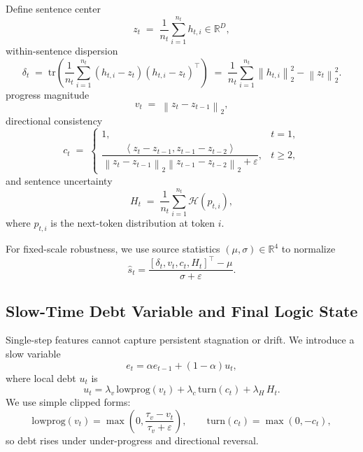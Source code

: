 \documentclass{article}
\newcommand{\R}{\mathbb{R}}
\newcommand{\norm}[1]{\left\lVert #1 \right\rVert}
\newcommand{\inner}[2]{\left\langle #1, #2 \right\rangle}
\newcommand{\tr}{\mathrm{tr}}
\newcommand{\eps}{\varepsilon}
\begin{document}
Define sentence center
\begin{equation}
z_t \;=\; \frac{1}{n_t}\sum_{i=1}^{n_t} h_{t,i} \in \R^D,
\label{eq:zt}
\end{equation}
within-sentence dispersion
\begin{equation}
\delta_t \;=\; \tr\!\left(
\frac{1}{n_t}\sum_{i=1}^{n_t}(h_{t,i}-z_t)(h_{t,i}-z_t)^\top
\right)
\;=\; \frac{1}{n_t}\sum_{i=1}^{n_t} \norm{h_{t,i}}_2^2 - \norm{z_t}_2^2.
\label{eq:disp}
\end{equation}
progress magnitude
\begin{equation}
v_t \;=\; \norm{z_t-z_{t-1}}_2,
\label{eq:speed}
\end{equation}
directional consistency
\begin{equation}
c_t \;=\;
\begin{cases}
1, & t=1,\\[3pt]
\dfrac{\inner{z_t-z_{t-1}}{z_{t-1}-z_{t-2}}}
{\norm{z_t-z_{t-1}}_2\norm{z_{t-1}-z_{t-2}}_2+\eps}, & t\ge 2,
\end{cases}
\label{eq:consistency}
\end{equation}
and sentence uncertainty
\begin{equation}
H_t \;=\; \frac{1}{n_t}\sum_{i=1}^{n_t} \mathcal{H}(p_{t,i}),
\label{eq:entropy}
\end{equation}
where $p_{t,i}$ is the next-token distribution at token $i$.

For fixed-scale robustness, we use source statistics $(\mu,\sigma)\in\R^4$ to normalize
\begin{equation}
\hat s_t = \frac{[\delta_t,v_t,c_t,H_t]^\top-\mu}{\sigma+\eps}.
\label{eq:norm}
\end{equation}

\subsection{Slow-Time Debt Variable and Final Logic State}
\label{sec:mt}
Single-step features cannot capture persistent stagnation or drift. We introduce a slow variable
\begin{equation}
e_t = \alpha e_{t-1} + (1-\alpha)u_t,
\label{eq:debt}
\end{equation}
where local debt $u_t$ is
\begin{equation}
u_t =
\lambda_v\,\mathrm{lowprog}(v_t)+
\lambda_c\,\mathrm{turn}(c_t)+
\lambda_H\,H_t.
\label{eq:ut}
\end{equation}
We use simple clipped forms:
\begin{equation}
\mathrm{lowprog}(v_t)=\max\!\left(0,\frac{\tau_v-v_t}{\tau_v+\eps}\right),\qquad
\mathrm{turn}(c_t)=\max(0,-c_t),
\label{eq:debt_terms}
\end{equation}
so debt rises under under-progress and directional reversal.
\end{document}
